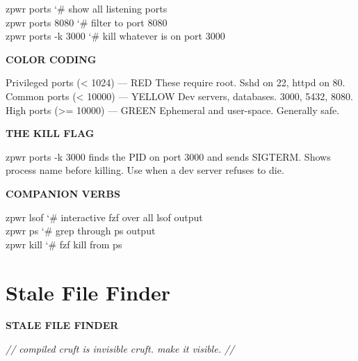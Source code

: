 \documentclass[11pt,a4paper,twoside]{book}
\begin{document}
\begin{codebox}
\color{neongreen}zpwr ports                 {\char`\#} show all listening ports\\
\color{neongreen}zpwr ports 8080            {\char`\#} filter to port 8080\\
\color{neongreen}zpwr ports -k 3000         {\char`\#} kill whatever is on port 3000\\
\end{codebox}


\vspace{12pt}
{\bfseries\color{neonyellow} COLOR CODING}\vspace{4pt}

Privileged ports (< 1024)    — RED These require root. Sshd on 22, httpd on 80. Common ports (< 10000)       — YELLOW Dev servers, databases. 3000, 5432, 8080. High ports (>= 10000)        — GREEN Ephemeral and user-space. Generally safe.


\vspace{12pt}
{\bfseries\color{neonyellow} THE KILL FLAG}\vspace{4pt}

zpwr ports -k 3000 finds the PID on port 3000 and sends SIGTERM. Shows process name before killing. Use when a dev server refuses to die.


\vspace{12pt}
{\bfseries\color{neonyellow} COMPANION VERBS}\vspace{4pt}

\begin{codebox}
\color{neongreen}zpwr lsof                 {\char`\#} interactive fzf over all lsof output\\
\color{neongreen}zpwr ps                   {\char`\#} grep through ps output\\
\color{neongreen}zpwr kill                 {\char`\#} fzf kill from ps\\
\end{codebox}


\vspace{16pt}

\section{Stale File Finder}


\vspace{10pt}
{\large\bfseries\color{neoncyan} STALE FILE FINDER}\vspace{6pt}

{\small\itshape\color{dimtext} // compiled cruft is invisible cruft. make it visible. //}
\end{document}
